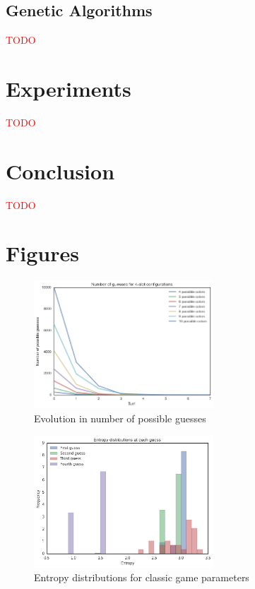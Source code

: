\documentclass[11pt]{article}
\begin{document}
\subsection{Genetic Algorithms}

\noindent \textcolor{red}{TODO}

\section{Experiments}

\noindent \textcolor{red}{TODO}


\section{Conclusion}

\noindent \textcolor{red}{TODO}


\newpage
\appendix

\section{Figures}

\begin{figure}[!htbp]
\centering
\includegraphics[width=0.6\textwidth]{img/num_guesses}
\caption{Evolution in number of possible guesses}
\label{fig:num_guesses}
\end{figure}

\begin{figure}[!htbp]
\centering
\includegraphics[width=0.6\textwidth]{img/entropy}
\caption{Entropy distributions for classic game parameters}
\label{fig:entropy}
\end{figure}
\end{document}
